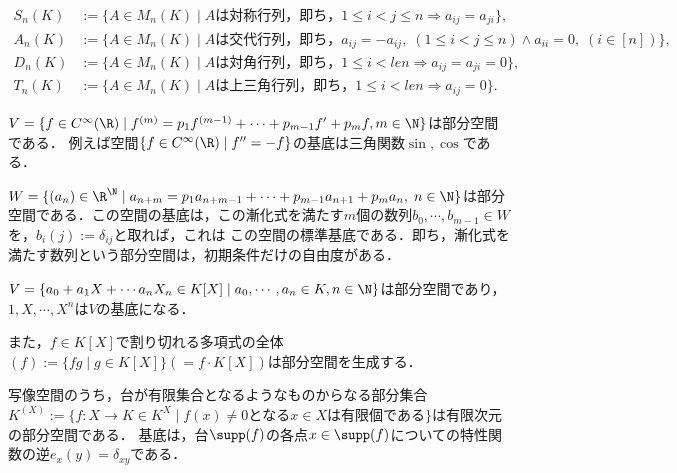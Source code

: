 \documentclass[uplatex, dvipdfmx]{jsreport}
\begin{document}
\begin{example}
    \begin{align*}
        S_n(K)&:=\{A\in M_n(K)\mid Aは対称行列，即ち，1\le i<j\le n\Rightarrow a_{ij}=a_{ji}\},\\
        A_n(K)&:=\{A\in M_n(K)\mid Aは交代行列，即ち，a_{ij}=-a_{ij},\;(1\le i<j\le n)\land a_{ii}=0,\;(i\in[n])\},\\
        D_n(K)&:=\{A\in M_n(K)\mid Aは対角行列，即ち，1\le i<le n\Rightarrow a_{ij}=a_{ji}=0\},\\
        T_n(K)&:=\{A\in M_n(K)\mid Aは上三角行列，即ち，1\le i<le n\Rightarrow a_{ij}=0\}.
    \end{align*}
\end{example}

\begin{example}
    $V=\{f\in C^\infty(\R)\mid f^{(m)}=p_1f^{(m-1)}+\cdots+p_{m-1}f'+p_mf, m\in\N\}$は部分空間である．
    例えば空間$\{f\in C^\infty(\R)\mid f''=-f\}$の基底は三角関数$\sin,\cos$である．
\end{example}

\begin{example}
    $W=\{(a_n)\in\R^\N\mid a_{n+m}=p_1a_{n+m-1}+\cdots+p_{m-1}a_{n+1}+p_ma_n,\;n\in\N\}$は部分空間である．この空間の基底は，この漸化式を満たす$m$個の数列$b_0,\cdots,b_{m-1}\in W$を，$b_i(j):=\delta_{ij}$と取れば，これは
    この空間の標準基底である．即ち，漸化式を満たす数列という部分空間は，初期条件だけの自由度がある．
\end{example}

\begin{example}
    $V=\{a_0+a_1X+\cdots a_nX_n\in K[X]\mid a_0,\cdots,a_n\in K,n\in\N\}$は部分空間であり，$1,X,\cdots,X^n$は$V$の基底になる．

    また，$f\in K[X]$で割り切れる多項式の全体$(f):=\{fg\mid g\in K[X]\}(=f\cdot K[X])$は部分空間を生成する．
\end{example}

\begin{example}
    写像空間のうち，台が有限集合となるようなものからなる部分集合$K^{(X)}:=\{f:X\to K\in K^X\mid f(x)\ne 0となるx\in Xは有限個である\}$は有限次元の部分空間である．
    基底は，台$\supp(f)$の各点$x\in\supp(f)$についての特性関数の逆$e_x(y)=\delta_{xy}$である．
\end{example}
\end{document}
